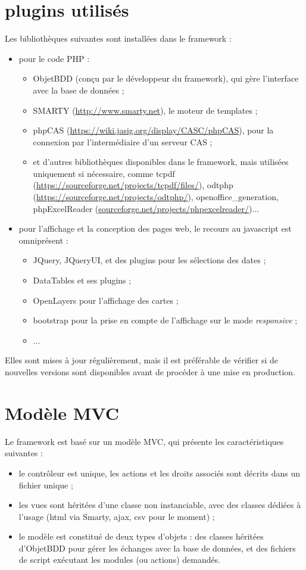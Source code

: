 \section*{plugins utilisés}
Les bibliothèques suivantes sont installées dans le framework :
\begin{itemize}
\item pour le code PHP :
\begin{itemize}
\item ObjetBDD (conçu par le développeur du framework), qui gère l'interface avec la base de données ;
\item SMARTY (\url{http://www.smarty.net}), le moteur de templates ;
\item phpCAS (\url{https://wiki.jasig.org/display/CASC/phpCAS}), pour la connexion par l'intermédiaire d'un serveur CAS ;
\item et d'autres bibliothèques disponibles dans le framework, mais utilisées uniquement si nécessaire, comme tcpdf (\url{https://sourceforge.net/projects/tcpdf/files/}), odtphp (\url{https://sourceforge.net/projects/odtphp/}), openoffice\_generation, phpExcelReader (\url{sourceforge.net/projects/phpexcelreader/})...
\end{itemize}
\item pour l'affichage et la conception des pages web, le recours au javascript est omniprésent :
\begin{itemize}
\item JQuery, JQueryUI, et des plugins pour les sélections des dates ;
\item DataTables et ses plugins ;
\item OpenLayers pour l'affichage des cartes ;
\item bootstrap pour la prise en compte de l'affichage sur le mode \textit{responsive} ;
\item ...

\end{itemize}
\end{itemize}

Elles sont mises à jour régulièrement, mais il est préférable de vérifier si de nouvelles versions sont disponibles avant de procéder à une mise en production.

\section*{Modèle MVC}

Le framework est basé sur un modèle MVC, qui présente les caractéristiques suivantes :
\begin{itemize}
\item le contrôleur est unique, les actions et les droits associés sont décrits dans un fichier unique ;
\item les vues sont héritées d'une classe non instanciable, avec des classes dédiées à l'usage (html via Smarty, ajax, csv pour le moment) ;
\item le modèle est constitué de deux types d'objets : des classes héritées d'ObjetBDD pour gérer les échanges avec la base de données, et des fichiers de script exécutant les modules (ou actions) demandés.
\end{itemize}

